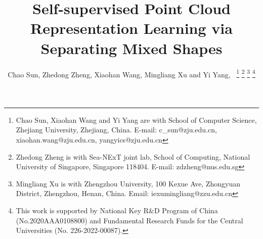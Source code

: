 \documentclass[journal]{IEEEtran}
\begin{document}
\title{  Self-supervised Point Cloud Representation Learning  via Separating Mixed Shapes}

\author{Chao Sun, Zhedong Zheng, Xiaohan Wang, Mingliang Xu and Yi Yang,~ 
\thanks{Chao Sun, Xiaohan Wang and Yi Yang are with School of Computer Science, Zhejiang University, Zhejiang, China. E-mail: c\_sun@zju.edu.cn, xiaohan.wang@zju.edu.cn, yangyics@zju.edu.cn}
\thanks{Zhedong Zheng is with Sea-NExT joint lab, School of Computing, National
University of Singapore, Singapore 118404. E-mail: zdzheng@nus.edu.sg}
\thanks{Mingliang Xu is with Zhengzhou University, 100 Kexue Ave, Zhongyuan District, Zhengzhou, Henan, China. Email: iexumingliang@zzu.edu.cn}
\thanks{This work is supported by National Key R\&D Program of China (No.2020AAA0108800) and Fundamental Research Funds for the Central Universities (No. 226-2022-00087).}
}

\maketitle
\end{document}
